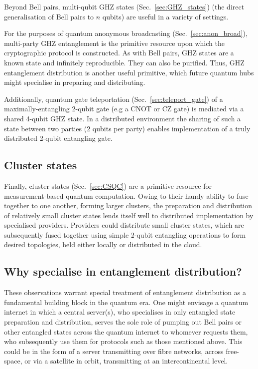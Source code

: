 Beyond Bell pairs, multi-qubit GHZ states (Sec.~\ref{sec:GHZ_states}) (the direct generalisation of Bell pairs to $n$ qubits) are useful in a variety of settings.

For the purposes of quantum anonymous broadcasting (Sec.~\ref{sec:anon_broad}), multi-party GHZ entanglement is the primitive resource upon which the cryptographic protocol is constructed. As with Bell pairs, GHZ states are a known state and infinitely reproducible. They can also be purified. Thus, GHZ entanglement distribution is another useful primitive, which future quantum hubs might specialise in preparing and distributing.

Additionally, quantum gate teleportation (Sec.~\ref{sec:teleport_gate}) of a maximally-entangling 2-qubit gate (e.g a CNOT or CZ gate) is mediated via a shared 4-qubit GHZ state. In a distributed environment the sharing of such a state between two parties (2 qubits per party) enables implementation of a truly distributed 2-qubit entangling gate.


%
%

\subsection{Cluster states}

Finally, cluster states (Sec.~\ref{sec:CSQC}) are a primitive resource for measurement-based quantum computation. Owing to their handy ability to fuse together to one another, forming larger clusters, the preparation and distribution of relatively small cluster states lends itself well to distributed implementation by specialised providers. Providers could distribute small cluster states, which are subsequently fused together using simple 2-qubit entangling operations to form desired topologies, held either locally or distributed in the cloud.

%
%

\subsection{Why specialise in entanglement distribution?}

These observations warrant special treatment of entanglement distribution as a fundamental building block in the quantum era. One might envisage a quantum internet in which a central server(s), who specialises in only entangled state preparation and distribution, serves the sole role of pumping out Bell pairs or other entangled states across the quantum internet to whomever requests them, who subsequently use them for protocols such as those mentioned above. This could be in the form of a server transmitting over fibre networks, across free-space, or via a satellite in orbit, transmitting at an intercontinental level.

